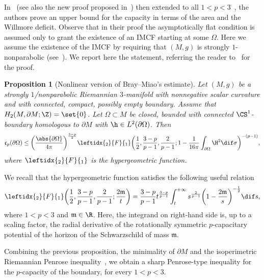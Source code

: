 \documentclass[10pt,a4paper]{amsart}
\numberwithin{equation}{section}
\newtheorem{Proposition}[Theorem]{Proposition}
\renewcommand{\ncapa}{\mathfrak{c}}
\newcommand{\ma}{\mathfrak{m}}
\begin{document}
In~\cite[Theorem 2]{bray_capacitysurfacesmanifoldsnonnegative_2008} (see also the new proof proposed in~\cite{oronzio_admmassareacapacity_2022}) then extended to all $1<p<3$~\cite{xiao_harmoniccapacityasymptoticallyflat_2016}, the authors prove an upper bound for the capacity in terms of the area and the Willmore deficit. Observe that in their proof the asymptotically flat condition is assumed only to grant the existence of an IMCF starting at some $\Omega$. Here we assume the existence of the IMCF by requiring that $(M,g)$ is strongly $1$-nonparabolic (see~\cite{benatti_isoperimetricriemannianpenroseinequality_2022}).
We report here the statement, referring the reader to~\cite{bray_capacitysurfacesmanifoldsnonnegative_2008,xiao_harmoniccapacityasymptoticallyflat_2016} for the proof.

\begin{Proposition}[Nonlinear version of Bray--Miao's estimate]\label{thm:p-braymiao}
Let $(M,g)$ be a strongly $1$\-/nonparabolic Riemannian $3$-manifold with nonnegative scalar curvature and with connected, compact, possibly empty boundary. Assume that $H_2(M, \partial M; \Z) = \set{0}$. Let $\Omega\subset M$ be closed, bounded with connected $\CS^{1}$-boundary homologous to $\partial M$ with $\h\in L^2(\partial \Omega)$. Then
 \[
 \ncapa_p(\partial \Omega) \leq \bigg( \frac{\abs{\partial \Omega}}{4\pi}\bigg)^{\frac{3-p}{2}} \leftidx{_2}{F}{_1}\bigg(\frac{ 1}{2}, \frac{3-p}{p-1}, \frac{2}{p-1}; 1-\frac{1}{16\pi}\int_{\partial \Omega}\H^2 \dif \sigma\bigg)^{{-(p-1)}},
 \]
where $\leftidx{_2}{F}{_1}$ is the hypergeometric function.
\end{Proposition}
We recall that the hypergeometric function satisfies the following useful relation
\begin{equation}\label{eq:hypergeometric_relation}
 \leftidx{_2}{F}{_1}\bigg(\frac{ 1}{2}, \frac{3-p}{p-1}, \frac{2}{p-1}; \frac{2\ma}{t}\bigg)=\frac{3-p}{p-1}t^{\frac{3-p}{p-1}}\int_t^{+\infty}s^{\frac{2}{p-1}}\bigg(1- \frac{2\ma}{s}\bigg)^{-\frac{1}{2}} \dif s,
\end{equation}
where $1<p<3$ and $\ma\in \R$. Here, the integrand on right-hand side is, up to a scaling factor, the radial derivative of the rotationally symmetric $p$-capacitary potential of the horizon of the Schwarzschild of mass $\ma$.

Combining the previous proposition, the minimality of $\partial M$ and the isoperimetric Riemannian Penrose inequality~\cite[Theorem~1.3]{benatti_isoperimetricriemannianpenroseinequality_2022}, we obtain a sharp Penrose-type inequality for the $p$-capacity of the boundary, for every $1<p<3$.
\end{document}

